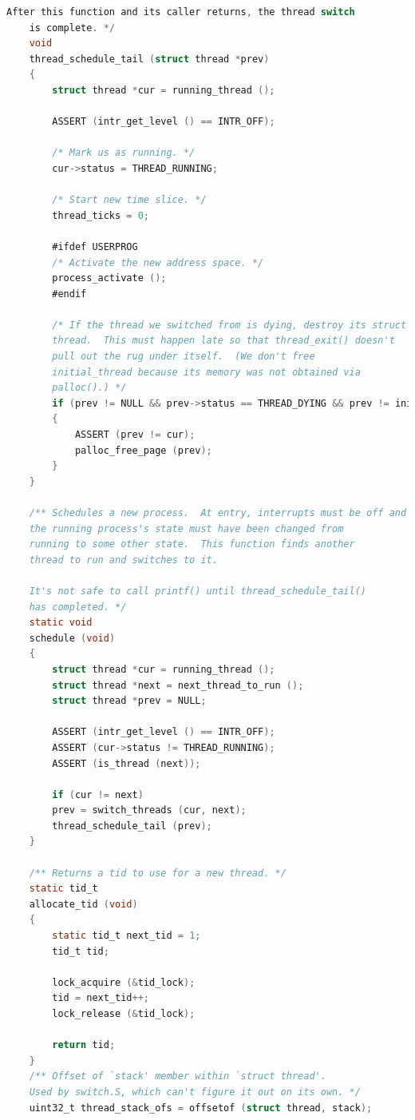 \documentclass{article}
\begin{document}
\begin{lstlisting}[language=C, title=\texttt{thread.c}]
	After this function and its caller returns, the thread switch
	is complete. */
	void
	thread_schedule_tail (struct thread *prev)
	{
		struct thread *cur = running_thread ();
		
		ASSERT (intr_get_level () == INTR_OFF);
		
		/* Mark us as running. */
		cur->status = THREAD_RUNNING;
		
		/* Start new time slice. */
		thread_ticks = 0;
		
		#ifdef USERPROG
		/* Activate the new address space. */
		process_activate ();
		#endif
		
		/* If the thread we switched from is dying, destroy its struct
		thread.  This must happen late so that thread_exit() doesn't
		pull out the rug under itself.  (We don't free
		initial_thread because its memory was not obtained via
		palloc().) */
		if (prev != NULL && prev->status == THREAD_DYING && prev != initial_thread) 
		{
			ASSERT (prev != cur);
			palloc_free_page (prev);
		}
	}
	
	/** Schedules a new process.  At entry, interrupts must be off and
	the running process's state must have been changed from
	running to some other state.  This function finds another
	thread to run and switches to it.
	
	It's not safe to call printf() until thread_schedule_tail()
	has completed. */
	static void
	schedule (void) 
	{
		struct thread *cur = running_thread ();
		struct thread *next = next_thread_to_run ();
		struct thread *prev = NULL;
		
		ASSERT (intr_get_level () == INTR_OFF);
		ASSERT (cur->status != THREAD_RUNNING);
		ASSERT (is_thread (next));
		
		if (cur != next)
		prev = switch_threads (cur, next);
		thread_schedule_tail (prev);
	}
	
	/** Returns a tid to use for a new thread. */
	static tid_t
	allocate_tid (void) 
	{
		static tid_t next_tid = 1;
		tid_t tid;
		
		lock_acquire (&tid_lock);
		tid = next_tid++;
		lock_release (&tid_lock);
		
		return tid;
	}
	/** Offset of `stack' member within `struct thread'.
	Used by switch.S, which can't figure it out on its own. */
	uint32_t thread_stack_ofs = offsetof (struct thread, stack);
	
\end{lstlisting}

\normalsize
\end{document}
